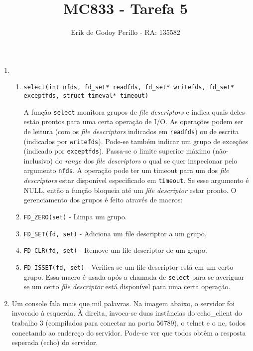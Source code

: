 \documentclass[11pt]{article}
\newcommand{\tit}[1]{\textit{#1}}
\newcommand{\ttt}[1]{\texttt{#1}}
\begin{document}
\title{MC833 - Tarefa 5}
\author{Erik de Godoy Perillo - RA: 135582}
\maketitle

\begin{enumerate}

\item 
	\begin{enumerate}
		\item \ttt{select(int nfds, fd\_set* readfds, fd\_set* writefds, 
				fd\_set* exceptfds, struct timeval* timeout)}

			A função \ttt{select} monitora grupos de \tit{file descriptors} 
			e indica quais deles estão prontos para uma certa operação
			de I/O. As operações podem ser de leitura (com os \tit{file 
			descriptors} indicados em \ttt{readfds}) ou de escrita 
			(indicados por \ttt{writefds}). Pode-se também indicar um grupo de 
			exceções (indicado por \ttt{exceptfds}). Passa-se o limite superior
			máximo (não-inclusivo) do \tit{range} dos \tit{file descriptors}
			o qual se quer inspecionar pelo argumento \ttt{nfds}. A operação
			pode ter um timeout para um dos \tit{file descriptors} estar 
			disponível especificado em \ttt{timeout}. Se esse argumento
			é NULL, então a função bloqueia até um \tit{file descriptor} 
			estar pronto.
			O gerenciamento dos grupos é feito através de macros:
			
		\item \ttt{FD\_ZERO(set)} - Limpa um grupo.
		\item \ttt{FD\_SET(fd, set)} - 
			Adiciona um file descriptor a um grupo.
		\item \ttt{FD\_CLR(fd, set)} - Remove um file descriptor de um grupo.
		\item \ttt{FD\_ISSET(fd, set)} - Verifica se um file descriptor está em 
			um certo grupo. Essa macro é usada após a chamada de \ttt{select}
			para se averiguar se um certo \tit{file descriptor} está disponível
			para uma certa operação.
	\end{enumerate}

	\item Um console fala mais que mil palavras.
		Na imagem abaixo, o servidor foi invocado à esquerda.
		À direita, invoca-se duas instâncias do echo\_client do trabalho
		3 (compilados para conectar na porta 56789), o telnet e o nc, todos
		conectando ao endereço do servidor. Pode-se ver que todos obtêm
		a resposta esperada (echo) do servidor.


\end{enumerate}
\end{document}
